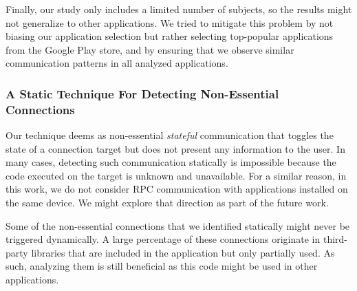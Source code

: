 Finally, our study only includes a limited number of subjects, so the results might not generalize to other applications.
We tried to mitigate this problem by not biasing our application selection but rather selecting top-popular applications from the Google Play store, and by ensuring that we observe similar communication patterns in all analyzed applications.

\subsubsection{A Static Technique For Detecting Non-Essential Connections}
Our technique deems 
%
as non-essential \emph{stateful} communication that toggles
the state of a connection target but does not present any information to the user. 
In many cases, detecting such
communication statically is impossible because the code executed on
the target is unknown and unavailable. 
For a similar reason, in this work, we do not consider RPC communication with applications
installed on the same device. We might explore that direction as part of the future work. 
 
Some of the non-essential connections that we identified statically might never be triggered dynamically. 
A large percentage of these connections originate in  
third-party libraries that are included in the application but only partially used. 
As such, analyzing them is still beneficial as this code might be used in other applications.
